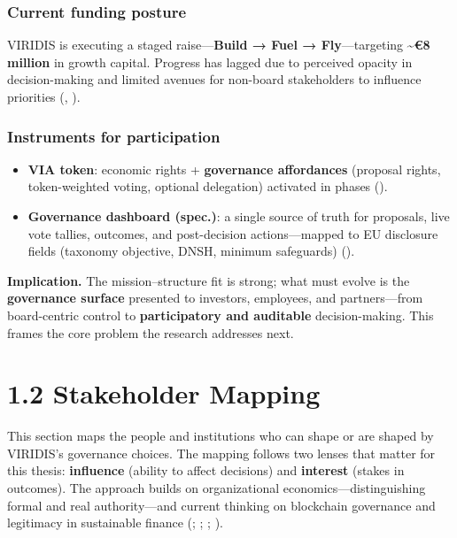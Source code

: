 \documentclass[
  english,
  12pt,
  oneside,
  open=any]{scrbook}
\providecommand{\tightlist}{%
  \setlength{\itemsep}{0pt}\setlength{\parskip}{0pt}}\usepackage{longtable,booktabs,array}
\begin{document}
\subsubsection{Current funding posture}\label{current-funding-posture}

VIRIDIS is executing a staged raise---\textbf{Build → Fuel →
Fly}---targeting \textasciitilde{}\textbf{€8 million} in growth capital.
Progress has lagged due to perceived opacity in decision-making and
limited avenues for non-board stakeholders to influence priorities
(,
).

\subsubsection{Instruments for
participation}\label{instruments-for-participation}

\begin{itemize}
\tightlist
\item
  \textbf{VIA token}: economic rights + \textbf{governance affordances}
  (proposal rights, token-weighted voting, optional delegation)
  activated in phases ().\\
\item
  \textbf{Governance dashboard (spec.)}: a single source of truth for
  proposals, live vote tallies, outcomes, and post-decision
  actions---mapped to EU disclosure fields (taxonomy objective, DNSH,
  minimum safeguards)
  ().
\end{itemize}

\textbf{Implication.} The mission--structure fit is strong; what must
evolve is the \textbf{governance surface} presented to investors,
employees, and partners---from board-centric control to
\textbf{participatory and auditable} decision-making. This frames the
core problem the research addresses next.

\section{1.2 Stakeholder Mapping}\label{sec-stakeholders}

This section maps the people and institutions who can shape or are
shaped by VIRIDIS's governance choices. The mapping follows two lenses
that matter for this thesis: \textbf{influence} (ability to affect
decisions) and \textbf{interest} (stakes in outcomes). The approach
builds on organizational economics---distinguishing formal and real
authority---and current thinking on blockchain governance and legitimacy
in sustainable finance
(;
;
; ).
\end{document}
